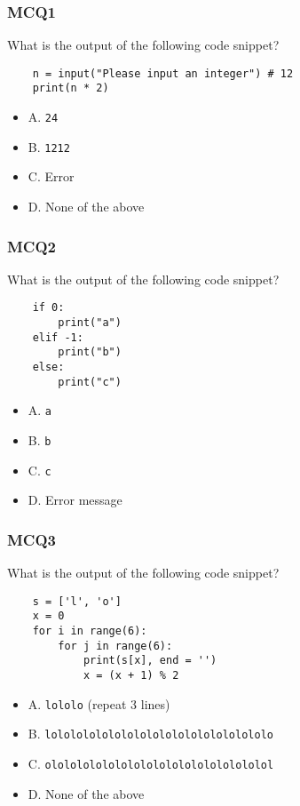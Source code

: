 \documentclass{beamer}
\begin{document}
\begin{frame}[fragile]
    \frametitle{MCQ1}
    What is the output of the following code snippet?
    \begin{verbatim}
    n = input("Please input an integer") # 12
    print(n * 2)
    \end{verbatim}

    \begin{itemize}
        \item A. \texttt{24}
        \item B. \texttt{1212}
        \item C. Error
        \item D. None of the above
    \end{itemize}
\end{frame}

\begin{frame}[fragile]
    \frametitle{MCQ2}
    What is the output of the following code snippet?
    \begin{verbatim}
    if 0:
        print("a")
    elif -1:
        print("b")
    else:
        print("c")
    \end{verbatim}

    \begin{itemize}
        \item A. \texttt{a}
        \item B. \texttt{b}
        \item C. \texttt{c}
        \item D. Error message
    \end{itemize}
\end{frame}

\begin{frame}[fragile]
    \frametitle{MCQ3}
    What is the output of the following code snippet?
    \begin{verbatim}
    s = ['l', 'o']
    x = 0
    for i in range(6):
        for j in range(6):
            print(s[x], end = '')
            x = (x + 1) % 2
    \end{verbatim}
    \begin{itemize}
        \item A. \texttt{lololo} (repeat 3 lines)
        \item B. \texttt{lolololololololololololololololololo}
        \item C. \texttt{olololololololololololololololololol}
        \item D. None of the above
    \end{itemize}
\end{frame}
\end{document}
